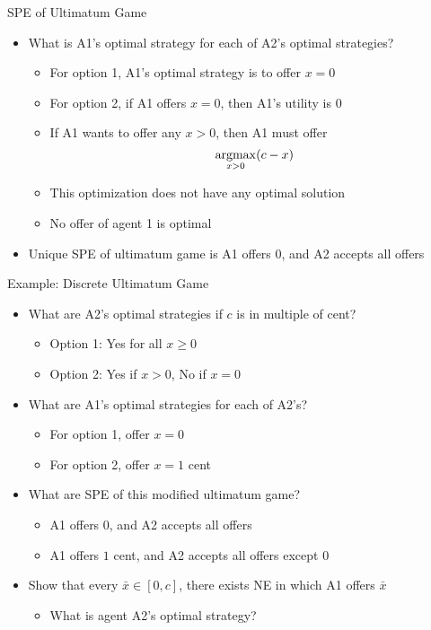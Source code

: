 \documentclass[11pt,aspectratio=169]{beamer}
\begin{document}
  
  \begin{frame}{SPE of Ultimatum Game}
   \begin{itemize}[<+->]
   \setlength{\itemsep}{1em}
    \item What is A1's optimal strategy for each of A2's optimal strategies?
    \begin{itemize}
    \setlength{\itemsep}{0.5em}
     \item For option 1, A1's optimal strategy is to offer $x = 0$
     \item For option 2, if A1 offers $x=0$, then A1's utility is $0$
     \item If A1 wants to offer any $x > 0$, then A1 must offer 
     $$\underset{x > 0}{\operatorname*{argmax}} (c - x)$$
     \item This optimization does not have any optimal solution
     \item \alert{No offer of agent 1 is optimal}
    \end{itemize}
    \item Unique SPE of ultimatum game is \alert{A1 offers 0, and A2 accepts all offers}
   \end{itemize}
  \end{frame}


  \begin{frame}{Example: Discrete Ultimatum Game}
   \begin{itemize}[<+->]
   \setlength{\itemsep}{1.2em}
    \item What are A2's optimal strategies if $c$ is in multiple of cent?
    \begin{itemize}
     \item \alert{Option 1}: Yes for all $x \geq 0$
     \item \alert{Option 2}: Yes if $x > 0$, No if $x = 0$
    \end{itemize}
    \item What are A1's optimal strategies for each of A2's?
    \begin{itemize}
     \item For option 1, offer $x = 0$
     \item For option 2, offer $x = 1$ cent
    \end{itemize}
    \item What are SPE of this modified ultimatum game?
    \begin{itemize}
     \item A1 offers $0$, and A2 accepts all offers
     \item A1 offers $1$ cent, and A2 accepts all offers except $0$
    \end{itemize}
    \item Show that every $\bar{x} \in [0, c]$, there exists NE in which A1 offers $\bar{x}$
    \begin{itemize}
     \item What is agent A2's optimal strategy?
    \end{itemize}
   \end{itemize}
  \end{frame}
\end{document}
